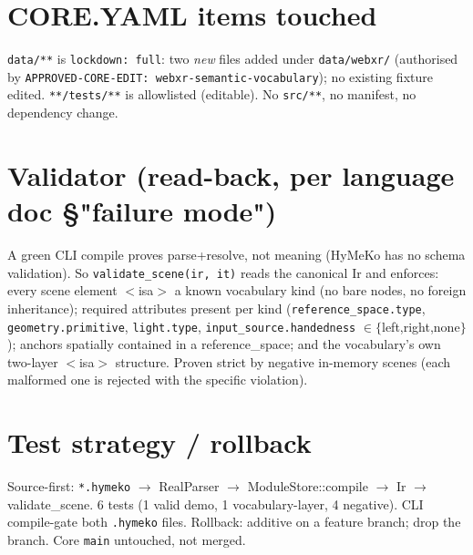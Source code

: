 \documentclass[11pt]{article}
\begin{document}
\section*{CORE.YAML items touched}
\texttt{data/**} is \texttt{lockdown: full}: two \emph{new} files added under \texttt{data/webxr/}
(authorised by \texttt{APPROVED-CORE-EDIT: webxr-semantic-vocabulary}); no existing fixture edited.
\texttt{**/tests/**} is allowlisted (editable). No \texttt{src/**}, no manifest, no dependency change.

\section*{Validator (read-back, per language doc \S{}"failure mode")}
A green CLI compile proves parse+resolve, not meaning (HyMeKo has no schema validation). So
\texttt{validate\_scene(ir, it)} reads the canonical Ir and enforces: every scene element $<$isa$>$ a
known vocabulary kind (no bare nodes, no foreign inheritance); required attributes present per kind
(\texttt{reference\_space.type}, \texttt{geometry.primitive}, \texttt{light.type},
\texttt{input\_source.handedness} $\in\{$left,right,none$\}$); anchors spatially contained in a
reference\_space; and the vocabulary's own two-layer $<$isa$>$ structure. Proven strict by
negative in-memory scenes (each malformed one is rejected with the specific violation).

\section*{Test strategy / rollback}
Source-first: \texttt{*.hymeko} $\to$ RealParser $\to$ ModuleStore::compile $\to$ Ir $\to$
validate\_scene. 6 tests (1 valid demo, 1 vocabulary-layer, 4 negative). CLI compile-gate both
\texttt{.hymeko} files. Rollback: additive on a feature branch; drop the branch. Core \texttt{main}
untouched, not merged.
\end{document}
